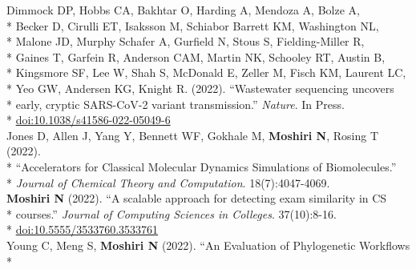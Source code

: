 \documentclass[margin,line]{res}
\begin{document}
\begin{resume}
\hspace*{9mm} Dimmock DP, Hobbs CA, Bakhtar O, Harding A, Mendoza A, Bolze A,\\*
\hspace*{9mm} Becker D, Cirulli ET, Isaksson M, Schiabor Barrett KM, Washington NL,\\*
\hspace*{9mm} Malone JD, Murphy Schafer A, Gurfield N, Stous S, Fielding-Miller R,\\*
\hspace*{9mm} Gaines T, Garfein R, Anderson CAM, Martin NK, Schooley RT, Austin B,\\*
\hspace*{9mm} Kingsmore SF, Lee W, Shah S, McDonald E, Zeller M, Fisch KM, Laurent LC,\\*
\hspace*{9mm} Yeo GW, Andersen KG, Knight R. (2022). ``Wastewater sequencing uncovers\\*
\hspace*{9mm} early, cryptic SARS-CoV-2 variant transmission.'' \textit{Nature}. In Press.\\*\vspace{2mm}
\hspace*{8mm} \href{https://doi.org/10.1038/s41586-022-05049-6}{doi:10.1038/s41586-022-05049-6}\\
\hspace*{4mm} Jones D, Allen J, Yang Y, Bennett WF, Gokhale M, \textbf{Moshiri N}, Rosing T (2022).\\*
\hspace*{9mm} ``Accelerators for Classical Molecular Dynamics Simulations of Biomolecules.''\\*\vspace{2mm}
\hspace*{8mm} \textit{Journal of Chemical Theory and Computation}. 18(7):4047-4069.\\
\hspace*{4mm} \textbf{Moshiri N} (2022). ``A scalable approach for detecting exam similarity in CS\\*
\hspace*{9mm} courses.'' \textit{Journal of Computing Sciences in Colleges}. 37(10):8-16.\\*\vspace{2mm}
\hspace*{8mm} \href{https://dl.acm.org/doi/abs/10.5555/3533760.3533761}{doi:10.5555/3533760.3533761}\\
\hspace*{4mm} Young C, Meng S, \textbf{Moshiri N} (2022). ``An Evaluation of Phylogenetic Workflows\\*\vspace{2mm}

\end{resume}
\end{document}
